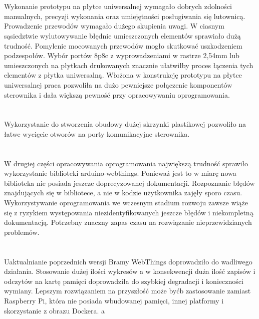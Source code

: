\documentclass[11pt]{report}
\begin{document}
\section{}
Wykonanie prototypu na płytce uniwersalnej wymagało dobrych zdolności manualnych, precyzji wykonania oraz umiejętności posługiwania się lutownicą. Prowadzenie przewodów wymagało dużego skupienia uwagi. W ciasnym sąsiedztwie wylutowywanie błędnie umieszczonych elementów sprawiało dużą trudność. Pomylenie mocowanych przewodów mogło skutkować uszkodzeniem podzespołów.
Wybór portów 8p8c z wyprowadzeniami w rastrze 2,54mm lub umieszczonych na płytkach drukowanych znacznie ułatwiłby proces łączenia tych elementów z płytka uniwersalną.
Włożona w konstrukcję prototypu na płytce uniwersalnej praca pozwoliła na dużo pewniejsze połączenie komponentów sterownika i dała większą pewność przy opracowywaniu oprogramowania.
\section{}
Wykorzystanie do stworzenia obudowy dużej skrzynki plastikowej pozwoliło na łatwe wycięcie otworów na porty komunikacyjne sterownika.
\section{}
W drugiej części opracowywania oprogramowania największą trudność sprawiło wykorzystanie biblioteki arduino-webthings. Ponieważ jest to w miarę nowa biblioteka nie posiada jeszcze doprecyzowanej dokumentacji. Rozpoznanie błędów znajdujących się w bibliotece, a nie w kodzie użytkownika zajęły sporo czasu.
Wykorzystywanie oprogramowania we wczesnym stadium rozwoju zawsze wiąże się z ryzykiem występowania niezidentyfikowanych jeszcze błędów i niekompletną dokumentacją. Potrzebny znaczny zapas czasu na rozwiązanie nieprzewidzianych problemów.
\section{}
Uaktualnianie poprzednich wersji Bramy WebThings doprowadziło do wadliwego działania.
Stosowanie dużej ilości wykresów a w konsekwencji duża ilość zapisów i odczytów na kartę pamięci doprowadziła do szybkiej degradacji i konieczności wymiany.
Lepszym rozwiązaniem na przyszłość może byćb zastosowanie zamiast Raspberry Pi, która nie posiada wbudowanej pamięci, innej platformy i skorzystanie z obrazu Dockera.
a 
 
\end{document}
